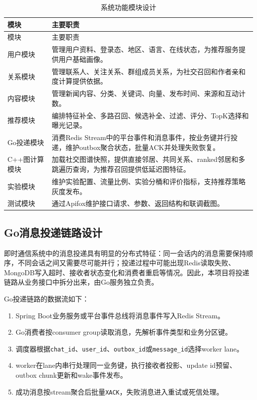 \begin{longtable}{p{}p{}}
  \caption{系统功能模块设计}                                                       \\
  \toprule
  模块       & 主要职责                                                          \\
  \midrule
  \endfirsthead
  \toprule
  模块       & 主要职责                                                          \\
  \midrule
  \endhead
  用户模块     & 管理用户资料、登录态、地区、语言、在线状态，为推荐服务提供用户基础画像。                          \\
  关系模块     & 管理联系人、关注关系、群组成员关系，为社交召回和作者亲和度计算提供依据。                          \\
  内容模块     & 管理新闻内容、分类、关键词、向量、发布时间、来源和互动计数。                                \\
  推荐模块     & 编排特征补全、多路召回、候选补全、过滤、评分、TopK选择和曝光记录。                           \\
  Go投递模块   & 消费Redis Stream中的平台事件和消息事件，按业务键并行投递，维护outbox聚合状态，批量ACK并处理失败恢复。 \\
  C++图计算模块 & 加载社交图谱快照，提供直接邻居、共同关系、ranked邻居和多跳遍历查询，为推荐召回提供低延迟图特征。           \\
  实验模块     & 维护实验配置、流量比例、实验分桶和评价指标，支持推荐策略灰度发布。                             \\
  测试模块     & 通过Apifox维护接口请求、参数、返回结构和联调截图。                                  \\
  \bottomrule
\end{longtable}

\subsection{Go消息投递链路设计}

即时通信系统中的消息投递具有明显的分布式特征：同一会话内的消息需要保持顺序，不同会话之间又需要尽可能并行；投递过程中可能出现Redis读取失败、MongoDB写入超时、接收者状态变化和消费者重启等情况。因此，本项目将投递链路从业务接口中拆分出来，由Go服务独立负责。

Go投递链路的数据流如下：

\begin{enumerate}
  \item Spring Boot业务服务或平台事件总线将消息事件写入Redis Stream。
  \item Go消费者按consumer group读取消息，先解析事件类型和业务分区键。
  \item 调度器根据\texttt{chat\_id}、\texttt{user\_id}、\texttt{outbox\_id}或\texttt{message\_id}选择worker lane。
  \item worker在lane内串行处理同一业务键，执行接收者投影、update id预留、outbox chunk更新和wake事件发布。
  \item 成功消息按stream聚合后批量\texttt{XACK}，失败消息进入重试或死信处理。
\end{enumerate}

